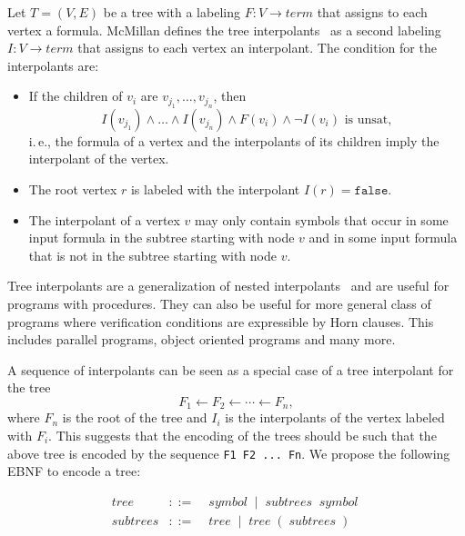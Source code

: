 \documentclass[a4paper,12pt]{article}
\begin{document}
Let $T=(V,E)$ be a tree with a labeling $F : V \to \mathit{term}$
that assigns to each vertex a formula.  McMillan defines the tree
interpolants~\cite{z3web} as a second labeling $I: V\to
\mathit{term}$ that assigns to each vertex an interpolant.  The
condition for the interpolants are:
\begin{itemize}
\item
  If the children of $v_i$ are $v_{j_1},\dots,v_{j_n}$, then
  \[I(v_{j_1})\land \dots \land I(v_{j_n}) \land F(v_i) \land \lnot I(v_i) \mbox{ is unsat},\]
  i.\,e., the formula of a vertex and the interpolants of its children imply the
  interpolant of the vertex.
\item The root vertex $r$ is labeled with the interpolant
  $I(r)=\mathtt{false}$.
\item The interpolant of a vertex $v$ may only contain symbols that occur
  in some input formula in the subtree starting with node $v$ and in
  some input formula that is not in the subtree starting with node $v$.
\end{itemize}

Tree interpolants are a generalization of nested
interpolants~\cite{HHP10} and are useful for programs with procedures.
They can also be useful for more general class of programs where
verification conditions are expressible by Horn clauses.  This
includes parallel programs, object oriented programs and many more.

A sequence of interpolants can be seen as a special case of a tree
interpolant for the tree
\[ F_1 \longleftarrow F_2 \longleftarrow \cdots \longleftarrow F_n,\]
where $F_n$ is the root of the tree and $I_i$ is the interpolants of
the vertex labeled with $F_i$.  This suggests that the encoding of
the trees should be such that the above tree is encoded by the
sequence \verb+F1 F2 ... Fn+.  We propose the following EBNF
to encode a tree:

\def\nt#1{\mathop{\mathit{#1}}} %

\begin{eqnarray*}
  \nt{tree}&::=&\nt{symbol}\mathrel{|}\nt{subtrees} \nt{symbol}\\
  \nt{subtrees}&::=&\nt{tree} \mathrel{|} \nt{tree} ( \nt{subtrees} ) \\
\end{eqnarray*}
\end{document}
